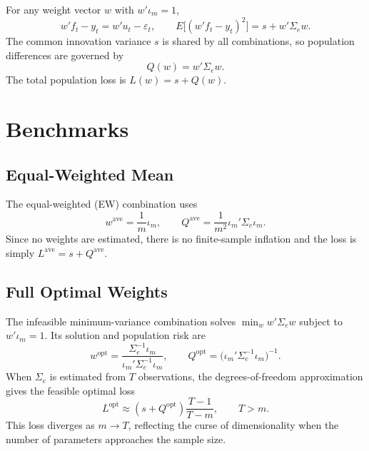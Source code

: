 \documentclass[12pt,a4paper]{article}
\theoremstyle{definition}
\begin{document}
For any weight vector $w$ with $w'\iota_m=1$,
\begin{equation}
w'f_t - y_t = w'u_t - \varepsilon_t, \qquad
E\bigl[(w'f_t-y_t)^2\bigr] = s + w'\Sigma_e w.
\end{equation}
The common innovation variance $s$ is shared by all combinations, so population
differences are governed by
\begin{equation}\label{eq:Q}
Q(w) = w'\Sigma_e w.
\end{equation}
The total population loss is $L(w)=s+Q(w)$.

\section{Benchmarks}

\subsection{Equal-Weighted Mean}

The equal-weighted (EW) combination uses
\begin{equation}
w^{\mathrm{ave}} = \frac{1}{m}\iota_m, \qquad
Q^{\mathrm{ave}} = \frac{1}{m^2}\iota_m'\Sigma_e\iota_m.
\end{equation}
Since no weights are estimated, there is no finite-sample inflation and the
loss is simply $L^{\mathrm{ave}}=s+Q^{\mathrm{ave}}$.

\subsection{Full Optimal Weights}

The infeasible minimum-variance combination solves
$\min_w w'\Sigma_e w$ subject to $w'\iota_m=1$. Its solution and
population risk are
\begin{equation}\label{eq:wopt}
w^{\mathrm{opt}} = \frac{\Sigma_e^{-1}\iota_m}{\iota_m'\Sigma_e^{-1}\iota_m},
\qquad
Q^{\mathrm{opt}} = \bigl(\iota_m'\Sigma_e^{-1}\iota_m\bigr)^{-1}.
\end{equation}
When $\Sigma_e$ is estimated from $T$ observations, the degrees-of-freedom
approximation gives the feasible optimal loss
\begin{equation}\label{eq:Lopt}
L^{\mathrm{opt}} \approx (s+Q^{\mathrm{opt}})\frac{T-1}{T-m}, \qquad T>m.
\end{equation}
This loss diverges as $m\to T$, reflecting the curse of dimensionality when
the number of parameters approaches the sample size.
\end{document}
